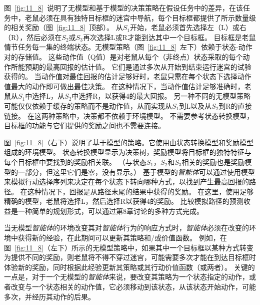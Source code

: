 图~\ref{fig:11_8}~说明了无模型和基于模型的决策策略在假设任务中的差异，在该任务中，老鼠必须在具有独特目标框的迷宫中导航，每个目标框都提供了所示数量级的相关奖励（图~\ref{fig:11_8}~顶部）。
从$ S_1 $开始，老鼠必须首先选择左（L）或右（R），然后必须在$ S_2 $或$ S_3 $再次选择L或R才能到达其中一个目标框。
目标框是老鼠情节任务每一集的终端状态。无模型策略（图~\ref{fig:11_8}~左下）依赖于状态-动作对的存储值。
这些动作值（Q值）是对老鼠从每个（非终点）状态采取的每个动作所能预期的最高回报的估计值。
它们是通过多次从开始到结束运行迷宫的试验获得的。
当动作值对最佳回报的估计足够好时，老鼠只需在每个状态下选择动作值最大的动作即可做出最佳决策。
在这种情况下，当动作值估计足够准确时，老鼠从$ S_1 $中选择L，从$ S_2 $中选择R，以获得4的最大回报。
另一种不同的无模型策略可能仅仅依赖于缓存的策略而不是动作值，从而实现从$ S_1 $到L以及从$ S_2 $到R的直接链接。
在这两种策略中，决策都不依赖于环境模型。
不需要参考状态转换模型，目标框的功能与它们提供的奖励之间也不需要连接。


图~\ref{fig:11_8}（右下）说明了基于模型的策略。它使用由状态转换模型和奖励模型组成的环境模型。
状态转换模型显示为决策树，奖励模型将目标框的独特特征与每个目标框中要找到的奖励相关联。
（与状态$ S_1 $，$ S_2 $和$ S_3 $相关的奖励也是奖励模型的一部分，但这里它们是零，没有显示。）
基于模型的\textit{智能体}可以通过使用模型来模拟行动选择序列来决定在每个状态下转向哪种方式，以找到产生最高回报的路径。
在这种情况下，回报是从路径末尾的结果中获得的奖励。
在这里，使用足够精确的模型，老鼠将选择L，然后选择R以获得4的奖励。
比较模拟路径的预测收益是一种简单的规划形式，可以通过第8章讨论的多种方式完成。


当无模型\textit{智能体}的环境改变其对\textit{智能体}行为的响应方式时，\textit{智能体}必须在改变的环境中获得新的经验，在此期间可以更新其策略和/或价值函数。
例如，在图~\ref{fig:11_8}（左下）所示的无模型策略中，如果其中一个目标框以某种方式转变为提供不同的奖励，则老鼠将不得不穿过迷宫，可能需要多次才能在到达目标框时体验新的奖励，同时根据此经验更新其策略或其行动价值函数（或两者）。
关键的一点是，对于一个无模型的\textit{智能体}来说，要改变其策略为一个状态指定的动作，或者改变与一个状态相关的动作值，它必须移动到该状态，从该状态开始动作，可能多次，并经历其动作的后果。


